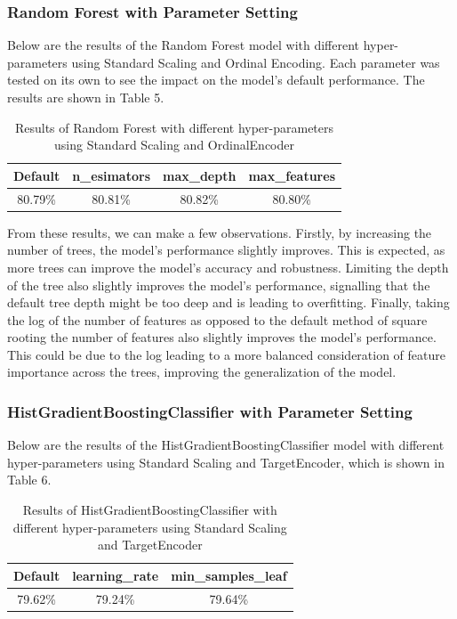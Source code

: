 \documentclass{article}
\begin{document}
\subsubsection{Random Forest with Parameter Setting}
Below are the results of the Random Forest model with different hyper-parameters using Standard Scaling and Ordinal Encoding. Each parameter was tested on its own to see the impact on the model's default performance. The results are shown in Table 5. 

\begin{table}[H]
  \centering
\begin{tabular}{|c|c|c|c|}
\hline
Default & n\_esimators & max\_depth & max\_features \\ \hline
80.79\% & 80.81\%      & 80.82\%    & 80.80\%       \\ \hline
\end{tabular}
\caption{Results of Random Forest with different hyper-parameters using Standard Scaling and OrdinalEncoder}
\end{table}

\noindent From these results, we can make a few observations. Firstly, by increasing the number of trees, the model's performance slightly improves. This is expected, as more trees can improve the model's accuracy and robustness. Limiting the depth of the tree also slightly improves the model's performance, signalling that the default tree depth might be too deep and is leading to overfitting. Finally, taking the log of the number of features as opposed to the default method of square rooting the number of features also slightly improves the model's performance. This could be due to the log leading to a more balanced consideration of feature importance across the trees, improving the generalization of the model.

\subsubsection{HistGradientBoostingClassifier with Parameter Setting}

Below are the results of the HistGradientBoostingClassifier model with different hyper-parameters using Standard Scaling and TargetEncoder, which is shown in Table 6.

\begin{table}[H]
  \centering
  \begin{tabular}{|c|c|c|}
    \hline
    Default & learning\_rate & min\_samples\_leaf \\ \hline
    79.62\% & 79.24\%        & 79.64\%            \\ \hline
  \end{tabular}
  \caption{Results of HistGradientBoostingClassifier with different hyper-parameters using Standard Scaling and TargetEncoder}
\end{table}
\end{document}
